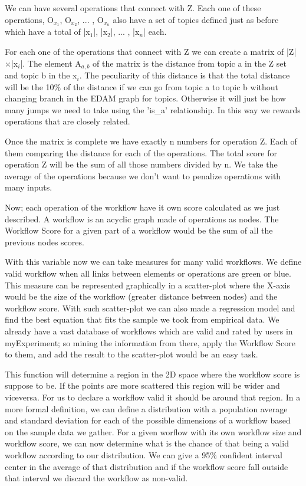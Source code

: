 \documentclass[a4paper,10pt]{article}
\begin{document}
  We can have several operations that connect with Z. Each one of these operations, O$_{x_{1}}$, O$_{x_{2}}$, ... , O$_{x_{n}}$ also have a set of topics defined just as before which have a total of |x$_{1}$|, |x$_{2}$|, ... , |x$_{n}$| each.\vspace{3 mm}

  For each one of the operations that connect with Z we can create a matrix of |Z|$\times$|x$_{i}$|. The element A$_{a,b}$ of the matrix is the distance from topic a in the Z set and topic b in the x$_{i}$. The peculiarity of this distance is that the total distance will be the 10\% of the distance if we can go from topic a to topic b without changing branch in the EDAM graph for topics. Otherwise it will just be how many jumps we need to take using the 'is\_a' relationship. In this way we rewards operations that are closely related.\vspace{3 mm}

  Once the matrix is complete we have exactly n numbers for operation Z. Each of them comparing the distance for each of the operations. The total score for operation Z will be the sum of all those numbers divided by n. We take the average of the operations because we don't want to penalize operations with many inputs.\vspace{3 mm}

  Now; each operation of the workflow have it own score calculated as we just described. A workflow is an acyclic graph made of operations as nodes. The Workflow Score for a given part of a workflow would be the sum of all the previous nodes scores.\vspace{3 mm}

  With this variable now we can take measures for many valid workflows. We define valid workflow when all links between elements or operations are green or blue. This measure can be represented graphically in a scatter-plot where the X-axis would be the size of the workflow (greater distance between nodes)  and the workflow score. With such scatter-plot we can also made a regression model and find the best equation that fits the sample we took from empirical data. We already have a vast database of workflows which are valid and rated by users in myExperiment; so mining the information from there, apply the Workflow Score to them, and add the result to the scatter-plot would be an easy task.\vspace{3 mm}

  This function will determine a region in the 2D space where the workflow score is suppose to be. If the points are more scattered this region will be wider and viceversa. For us to declare a workflow valid it should be around that region. In a more formal definition, we can define a distribution with a population average and standard deviation for each of the possible dimensions of a workflow based on the sample data we gather. For a given worflow with its own workflow size and workflow score, we can now determine what is the chance of that being a valid workflow according to our distribution. We can give a 95\% confident interval center in the average of that distribution and if the workflow score fall outside that interval we discard the workflow as non-valid.\vspace{3 mm}
\end{document}
